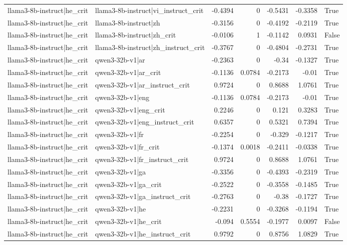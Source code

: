 \begin{table}
\begin{tabular}{l l r r r r l}
llama3-8b-instruct|he_crit & llama3-8b-instruct|vi_instruct_crit & -0.4394 & 0 & -0.5431 & -0.3358 & True \\
llama3-8b-instruct|he_crit & llama3-8b-instruct|zh & -0.3156 & 0 & -0.4192 & -0.2119 & True \\
llama3-8b-instruct|he_crit & llama3-8b-instruct|zh_crit & -0.0106 & 1 & -0.1142 & 0.0931 & False \\
llama3-8b-instruct|he_crit & llama3-8b-instruct|zh_instruct_crit & -0.3767 & 0 & -0.4804 & -0.2731 & True \\
llama3-8b-instruct|he_crit & qwen3-32b-v1|ar & -0.2363 & 0 & -0.34 & -0.1327 & True \\
llama3-8b-instruct|he_crit & qwen3-32b-v1|ar_crit & -0.1136 & 0.0784 & -0.2173 & -0.01 & True \\
llama3-8b-instruct|he_crit & qwen3-32b-v1|ar_instruct_crit & 0.9724 & 0 & 0.8688 & 1.0761 & True \\
llama3-8b-instruct|he_crit & qwen3-32b-v1|eng & -0.1136 & 0.0784 & -0.2173 & -0.01 & True \\
llama3-8b-instruct|he_crit & qwen3-32b-v1|eng_crit & 0.2246 & 0 & 0.121 & 0.3283 & True \\
llama3-8b-instruct|he_crit & qwen3-32b-v1|eng_instruct_crit & 0.6357 & 0 & 0.5321 & 0.7394 & True \\
llama3-8b-instruct|he_crit & qwen3-32b-v1|fr & -0.2254 & 0 & -0.329 & -0.1217 & True \\
llama3-8b-instruct|he_crit & qwen3-32b-v1|fr_crit & -0.1374 & 0.0018 & -0.2411 & -0.0338 & True \\
llama3-8b-instruct|he_crit & qwen3-32b-v1|fr_instruct_crit & 0.9724 & 0 & 0.8688 & 1.0761 & True \\
llama3-8b-instruct|he_crit & qwen3-32b-v1|ga & -0.3356 & 0 & -0.4393 & -0.2319 & True \\
llama3-8b-instruct|he_crit & qwen3-32b-v1|ga_crit & -0.2522 & 0 & -0.3558 & -0.1485 & True \\
llama3-8b-instruct|he_crit & qwen3-32b-v1|ga_instruct_crit & -0.2763 & 0 & -0.38 & -0.1727 & True \\
llama3-8b-instruct|he_crit & qwen3-32b-v1|he & -0.2231 & 0 & -0.3268 & -0.1194 & True \\
llama3-8b-instruct|he_crit & qwen3-32b-v1|he_crit & -0.094 & 0.5554 & -0.1977 & 0.0097 & False \\
llama3-8b-instruct|he_crit & qwen3-32b-v1|he_instruct_crit & 0.9792 & 0 & 0.8756 & 1.0829 & True \\

\end{tabular}
\end{table}
